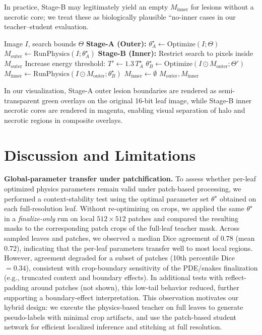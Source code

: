 \documentclass[journal]{IEEEtran}
\begin{document}
In practice, Stage-B may legitimately yield an empty $M_{\text{inner}}$ for lesions without a necrotic core; we treat these as biologically plausible ``no-inner cases in our teacher--student evaluation.

\begin{algorithm}
\caption{Two-Stage Nested Lesion Inference}
\label{alg:two_stage}
\begin{algorithmic}[1]
\REQUIRE Image $I$, search bounds $\Theta$
\STATE \textbf{Stage-A (Outer):} $\theta_A^\star \leftarrow \mathrm{Optimize}(I;\Theta)$
\STATE $M_{\text{outer}} \leftarrow \mathrm{RunPhysics}(I;\theta_A^\star)$ 
    \STATE \textbf{Stage-B (Inner):} Restrict search to pixels inside $M_{\text{outer}}$
    \STATE Increase energy threshold: $T' \leftarrow 1.3\,T_A^\star$
    \STATE $\theta_B^\star \leftarrow \mathrm{Optimize}(I \odot M_{\text{outer}};\Theta')$
    \STATE $M_{\text{inner}} \leftarrow \mathrm{RunPhysics}(I \odot M_{\text{outer}};\theta_B^\star)$ 
\ELSE
    \STATE $M_{\text{inner}} \leftarrow \emptyset$
\ENDIF
\RETURN $M_{\text{outer}}, M_{\text{inner}}$
\end{algorithmic}
\end{algorithm}

In our visualization, Stage-A outer lesion boundaries are rendered as semi-transparent green overlays on the original 16-bit leaf image, while Stage-B inner necrotic cores are rendered in magenta, enabling visual separation of halo and necrotic regions in composite overlays.

\section{Discussion and Limitations}

\textbf{Global-parameter transfer under patchification.}
To assess whether per-leaf optimized physics parameters remain valid under patch-based processing, we performed a context-stability test using the optimal parameter set $\theta^\star$ obtained on each full-resolution leaf. Without re-optimizing on crops, we applied the same $\theta^\star$ in a \emph{finalize-only} run on local $512\times512$ patches and compared the resulting masks to the corresponding patch crops of the full-leaf teacher mask. Across sampled leaves and patches, we observed a median Dice agreement of $0.78$ (mean $0.72$), indicating that the per-leaf parameters transfer well to most local regions. However, agreement degraded for a subset of patches (10th percentile Dice $=0.34$), consistent with crop-boundary sensitivity of the PDE/snakes finalization (e.g., truncated context and boundary effects). In additional tests with reflect-padding around patches (not shown), this low-tail behavior reduced, further supporting a boundary-effect interpretation. This observation motivates our hybrid design: we execute the physics-based teacher on full leaves to generate pseudo-labels with minimal crop artifacts, and use the patch-based student network for efficient localized inference and stitching at full resolution.
\end{document}
